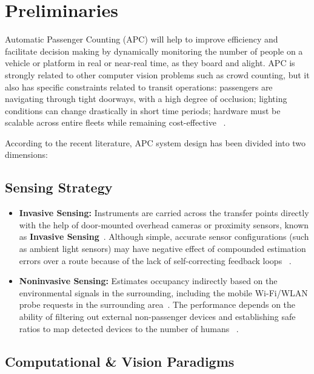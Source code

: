 
\section{Preliminaries}

Automatic Passenger Counting (APC) will help to improve efficiency and facilitate decision making by dynamically monitoring the number of people on a vehicle or platform in real or near-real time, as they board and alight. APC is strongly related to other computer vision problems such as crowd counting, but it also has specific constraints related to transit operations: passengers are navigating through tight doorways, with a high degree of occlusion; lighting conditions can change drastically in short time periods; hardware must be scalable across entire fleets while remaining cost-effective ~\cite{kuchar2023passenger}. 

According to the recent literature, APC system design has been divided into two dimensions:

\subsection{Sensing Strategy}

\begin{itemize}
    \item \textbf{Invasive Sensing:} Instruments are carried across the transfer points directly with the help of door-mounted overhead cameras or proximity sensors, known as \textbf{Invasive Sensing}~\cite{kuchar2023passenger}. Although simple, accurate sensor configurations (such as ambient light sensors) may have negative effect of compounded estimation errors over a route because of the lack of self-correcting feedback loops ~\cite{Aleksander2024}.

    \item \textbf{Noninvasive Sensing:} Estimates occupancy indirectly based on the environmental signals in the surrounding, including the mobile Wi-Fi/WLAN probe requests in the surrounding area~\cite{chang2023online}. The performance depends on the ability of filtering out external non-passenger devices and establishing safe ratios to map detected devices to the number of humans ~\cite{algomaiah2022utilizing}.
\end{itemize}

\subsection{Computational \& Vision Paradigms}

